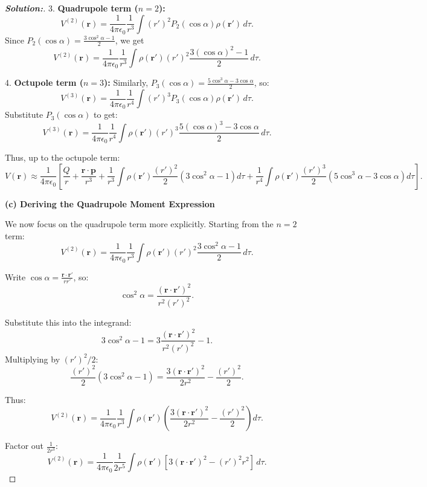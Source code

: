 \documentclass[12pt]{article}
\theoremstyle{definition}\newtheorem{problem}{Problem}
\newenvironment{solution}{\begin{proof}[\bfseries\textup{Solution:}]}{\end{proof}}
\begin{document}
\begin{solution}
    3. \textbf{Quadrupole term ($n=2$):}
    \[
    V^{(2)}(\mathbf{r}) = \frac{1}{4\pi \epsilon_0}\frac{1}{r^3}\int (r')^2 P_2(\cos\alpha)\rho(\mathbf{r}')\,d\tau.
    \]
    Since $P_2(\cos\alpha) = \frac{3\cos^2\alpha - 1}{2}$, we get
    \[
    V^{(2)}(\mathbf{r}) = \frac{1}{4\pi\epsilon_0}\frac{1}{r^3}\int \rho(\mathbf{r}') (r')^2\frac{3(\cos\alpha)^2 - 1}{2}\,d\tau.
    \]
    
    4. \textbf{Octupole term ($n=3$):}
    Similarly, $P_3(\cos\alpha) = \frac{5\cos^3\alpha - 3\cos\alpha}{2}$, so:
    \[
    V^{(3)}(\mathbf{r}) = \frac{1}{4\pi\epsilon_0}\frac{1}{r^4}\int (r')^3 P_3(\cos\alpha)\rho(\mathbf{r}')\,d\tau.
    \]
    Substitute $P_3(\cos\alpha)$ to get:
    \[
    V^{(3)}(\mathbf{r}) = \frac{1}{4\pi \epsilon_0}\frac{1}{r^4}\int \rho(\mathbf{r}') (r')^3 \frac{5(\cos\alpha)^3 - 3\cos\alpha}{2} \, d\tau.
    \]
    
    Thus, up to the octupole term:
    \[
    V(\mathbf{r}) \approx \frac{1}{4\pi\epsilon_0}\left[\frac{Q}{r} + \frac{\mathbf{r}\cdot\mathbf{p}}{r^3} + \frac{1}{r^3}\int \rho(\mathbf{r}')\frac{(r')^2}{2}(3\cos^2\alpha - 1)d\tau + \frac{1}{r^4}\int \rho(\mathbf{r}')\frac{(r')^3}{2}(5\cos^3\alpha - 3\cos\alpha)d\tau \right].
    \]
    
    \medskip
    
    \noindent\textbf{(c) Deriving the Quadrupole Moment Expression}
    
    We now focus on the quadrupole term more explicitly. Starting from the $n=2$ term:
    \[
    V^{(2)}(\mathbf{r}) = \frac{1}{4\pi\epsilon_0}\frac{1}{r^3} \int \rho(\mathbf{r}') (r')^2 \frac{3\cos^2\alpha - 1}{2}\,d\tau.
    \]
    
    Write $\cos\alpha = \frac{\mathbf{r}\cdot\mathbf{r}'}{r r'}$, so:
    \[
    \cos^2\alpha = \frac{(\mathbf{r}\cdot\mathbf{r}')^2}{r^2 (r')^2}.
    \]
    
    Substitute this into the integrand:
    \[
    3\cos^2\alpha - 1 = 3\frac{(\mathbf{r}\cdot\mathbf{r}')^2}{r^2 (r')^2} - 1.
    \]
    Multiplying by $(r')^2/2$:
    \[
    \frac{(r')^2}{2}(3\cos^2\alpha - 1) = \frac{3(\mathbf{r}\cdot\mathbf{r}')^2}{2r^2} - \frac{(r')^2}{2}.
    \]
    
    Thus:
    \[
    V^{(2)}(\mathbf{r}) = \frac{1}{4\pi\epsilon_0}\frac{1}{r^3}\int \rho(\mathbf{r}')\left(\frac{3(\mathbf{r}\cdot\mathbf{r}')^2}{2r^2}-\frac{(r')^2}{2}\right)d\tau.
    \]
    
    Factor out $\frac{1}{2r^3}$:
    \[
    V^{(2)}(\mathbf{r}) = \frac{1}{4\pi\epsilon_0}\frac{1}{2r^5}\int \rho(\mathbf{r}') [3(\mathbf{r}\cdot\mathbf{r}')^2 - (r')^2 r^2 ]\, d\tau.
    \]
    

\end{solution}
\end{document}
